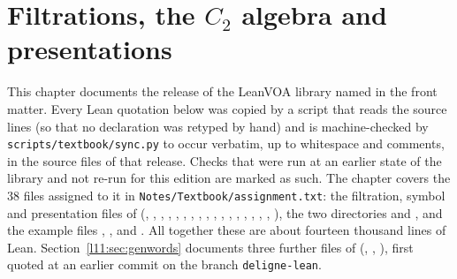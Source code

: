\chapter{Filtrations, the \texorpdfstring{$C_2$}{C2} algebra and presentations}\label{ch:L11}
\begingroup\setlength{\emergencystretch}{3em}

\providecommand{\lelevenvac}{\mathbf{1}}
\providecommand{\lelevenR}{R_V}
\providecommand{\lelevengr}{\operatorname{gr}}
\providecommand{\lelevenTR}{T(R)}
\providecommand{\lelevenF}{F}
\providecommand{\lelevenJ}{J}

This chapter documents the release of the LeanVOA library named in the front matter. Every Lean quotation below was copied by a script that reads the
source lines (so that no declaration was retyped by hand) and is machine-checked by
\texttt{scripts/textbook/sync.py} to occur verbatim, up to whitespace and comments, in the source
files of that release. Checks that were run at an earlier state of the library and not re-run for this edition are marked as such. The chapter covers the 38 files assigned to it in
\texttt{Notes/Textbook/assignment.txt}: the filtration, symbol and presentation files of
 (, ,
, , ,
, , ,
, ,
, , ,
, , , ,
), the two directories  and
, and the example files ,
,  and
. All together these are about fourteen thousand lines of
Lean. Section~\ref{l11:sec:genwords} documents three further files of
 (\allowbreak{},
\allowbreak{}, \allowbreak{}), first quoted at an
earlier commit on the branch \texttt{deligne-lean}.

